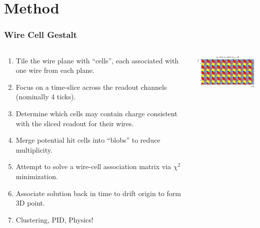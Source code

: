 \documentclass[xcolor=dvipsnames]{beamer}
\begin{document}





\section{Method}

\begin{frame}
  \frametitle{Wire Cell Gestalt}

  \begin{columns}
    \begin{column}{0.6\paperwidth}
      \scriptsize
      \begin{enumerate}
      \item Tile the wire plane with ``cells'', each associated with
        one wire from each plane.
      \item Focus on a time-slice across the readout channels
        (nominally 4 ticks).
      \item Determine which cells may contain charge consistent with
        the sliced readout for their wires.
      \item Merge potential hit cells into ``blobs'' to reduce
        multiplicity.
      \item Attempt to solve a wire-cell association matrix via
        $\chi^2$ minimization.
      \item Associate solution back in time to drift origin to form 3D point.
      \item Clustering, PID, Physics!
      \end{enumerate}
    \end{column}
    \begin{column}{0.4\paperwidth}
      \begin{center}
        \vspace{-1cm}

      \includegraphics[width=5cm]{cells.png}


\end{center}
\end{column}
\end{columns}
\end{frame}
\end{document}
